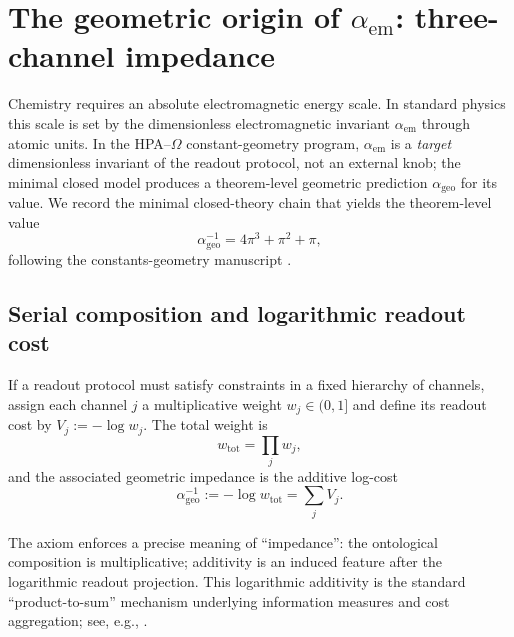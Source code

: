 \section{The geometric origin of \texorpdfstring{$\alpha_{\mathrm{em}}$}{alpha\_em}: three-channel impedance}
\label{sec:alpha_geo}

Chemistry requires an absolute electromagnetic energy scale. In standard physics this scale is set by the dimensionless electromagnetic invariant $\alpha_{\mathrm{em}}$ through atomic units. In the HPA--$\Omega$ constant-geometry program, $\alpha_{\mathrm{em}}$ is a \emph{target} dimensionless invariant of the readout protocol, not an external knob; the minimal closed model produces a theorem-level geometric prediction $\alpha_{\mathrm{geo}}$ for its value. We record the minimal closed-theory chain that yields the theorem-level value
\begin{equation}
\alpha_{\mathrm{geo}}^{-1}=4\pi^3+\pi^2+\pi,
\end{equation}
following the constants-geometry manuscript \cite{Ma2025PCG}.

\subsection{Serial composition and logarithmic readout cost}
\begin{axiom}\label{ax:serial_impedance_chem}
If a readout protocol must satisfy constraints in a fixed hierarchy of channels, assign each channel $j$ a multiplicative weight $w_j\in(0,1]$ and define its readout cost by $V_j:=-\log w_j$. The total weight is
\begin{equation}
w_{\mathrm{tot}}=\prod_j w_j,
\end{equation}
and the associated geometric impedance is the additive log-cost
\begin{equation}
\alpha_{\mathrm{geo}}^{-1}:=-\log w_{\mathrm{tot}}=\sum_j V_j.
\end{equation}
\end{axiom}
\begin{remark}
The axiom enforces a precise meaning of ``impedance'': the ontological composition is multiplicative; additivity is an induced feature after the logarithmic readout projection.
This logarithmic additivity is the standard ``product-to-sum'' mechanism underlying information measures and cost aggregation; see, e.g., \cite{Shannon1948,CoverThomas2006,Aczel1966}.
\end{remark}

